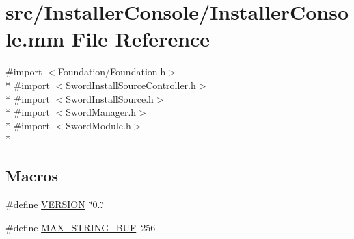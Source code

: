 \hypertarget{_installer_console_8mm}{\section{src/\-Installer\-Console/\-Installer\-Console.mm File Reference}
\label{_installer_console_8mm}
}
{\ttfamily \#import $<$Foundation/\-Foundation.\-h$>$}\\*
{\ttfamily \#import $<$Sword\-Install\-Source\-Controller.\-h$>$}\\*
{\ttfamily \#import $<$Sword\-Install\-Source.\-h$>$}\\*
{\ttfamily \#import $<$Sword\-Manager.\-h$>$}\\*
{\ttfamily \#import $<$Sword\-Module.\-h$>$}\\*
\subsection*{Macros}
\begin{DoxyCompactItemize}
\item 
\#define \hyperlink{_installer_console_8mm_a1c6d5de492ac61ad29aec7aa9a436bbf}{V\-E\-R\-S\-I\-O\-N}~\char`\"{}0..\char`\"{}
\item 
\#define \hyperlink{_installer_console_8mm_a241c29d2f83cc417ad8948d726389d1f}{M\-A\-X\-\_\-\-S\-T\-R\-I\-N\-G\-\_\-\-B\-U\-F}~256
\end{DoxyCompactItemize}
